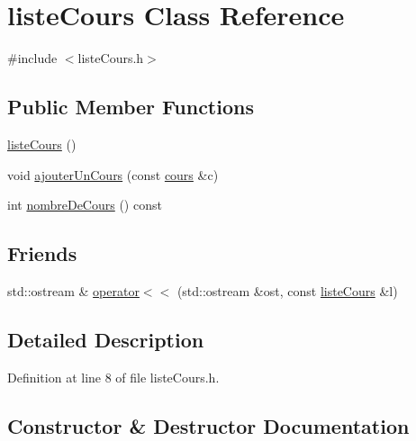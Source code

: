 \hypertarget{classliste_cours}{}\section{liste\+Cours Class Reference}
\label{classliste_cours}


{\ttfamily \#include $<$liste\+Cours.\+h$>$}

\subsection*{Public Member Functions}
\begin{DoxyCompactItemize}
\item 
\hyperlink{classliste_cours_af5a10a6e898373e43355b8a29dc20b83}{liste\+Cours} ()
\item 
void \hyperlink{classliste_cours_aacc38305cfea76d8cc77d710d144ce8b}{ajouter\+Un\+Cours} (const \hyperlink{classcours}{cours} \&c)
\item 
int \hyperlink{classliste_cours_a34b859c2380770eb560c0a6dcf01cc81}{nombre\+De\+Cours} () const
\end{DoxyCompactItemize}
\subsection*{Friends}
\begin{DoxyCompactItemize}
\item 
std\+::ostream \& \hyperlink{classliste_cours_a78ee4cc125386ff5f709ea4ec9438f69}{operator$<$$<$} (std\+::ostream \&ost, const \hyperlink{classliste_cours}{liste\+Cours} \&l)
\end{DoxyCompactItemize}


\subsection{Detailed Description}


Definition at line 8 of file liste\+Cours.\+h.



\subsection{Constructor \& Destructor Documentation}
\hypertarget{classliste_cours_af5a10a6e898373e43355b8a29dc20b83}{}\label{classliste_cours_af5a10a6e898373e43355b8a29dc20b83} 
